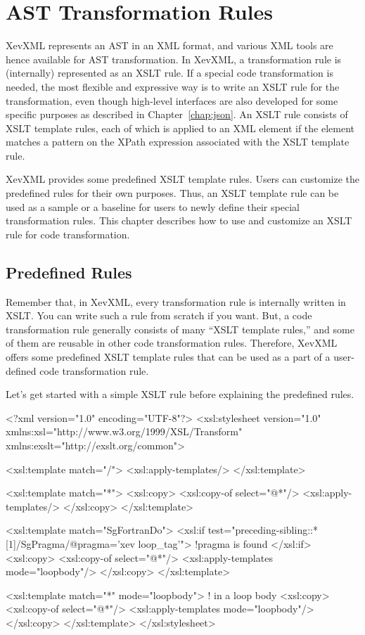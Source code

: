 \chapter{AST Transformation Rules}\label{chap:xslt}

XevXML represents an AST in an XML format, and various XML tools are
hence available for AST transformation. In XevXML, a transformation rule
is (internally) represented as an XSLT rule. If a special code
transformation is needed, the most flexible and expressive way is to
write an XSLT rule for the transformation, even though high-level
interfaces are also developed for some specific purposes as described in
Chapter~\ref{chap:json}. An XSLT rule consists of XSLT template rules,
each of which is applied to an XML element if the element matches a
pattern on the XPath expression associated with the XSLT template rule.

XevXML provides some predefined XSLT template rules.  Users can
customize the predefined rules for their own purposes.  Thus, an XSLT
template rule can be used as a sample or a baseline for users to newly
define their special transformation rules.  This chapter describes how
to use and customize an XSLT rule for code transformation.


\section{Predefined Rules}\label{sec:predef}
Remember that, in XevXML, every transformation rule is internally
written in XSLT. You can write such a rule from scratch if you want.
But, a code transformation rule generally consists of many ``XSLT
template rules,'' and some of them are reusable in other code
transformation rules.  Therefore, XevXML offers some predefined XSLT
template rules that can be used as a part of a user-defined code
transformation rule.

Let's get started with a simple XSLT rule before explaining the
predefined rules.
\begin{framed}
\begin{src}
<?xml version="1.0" encoding="UTF-8"?>
<xsl:stylesheet version="1.0"
   xmlns:xsl="http://www.w3.org/1999/XSL/Transform"
   xmlns:exslt="http://exslt.org/common">

  <xsl:template match="/">
    <xsl:apply-templates/>
  </xsl:template>

  <xsl:template match="*">
    <xsl:copy>
      <xsl:copy-of select="@*"/>
      <xsl:apply-templates/>
    </xsl:copy>
  </xsl:template>

  <xsl:template match="SgFortranDo">
    <xsl:if test="preceding-sibling::*[1]/SgPragma/@pragma='xev loop_tag'">
      !pragma is found
    </xsl:if>
    <xsl:copy>
      <xsl:copy-of select="@*"/>
      <xsl:apply-templates mode="loopbody"/>
    </xsl:copy>
  </xsl:template>

  <xsl:template match="*" mode="loopbody">
    ! in a loop body
    <xsl:copy>
      <xsl:copy-of select="@*"/>
      <xsl:apply-templates mode="loopbody"/>
    </xsl:copy>
  </xsl:template>
</xsl:stylesheet>
\end{src}
\end{framed}

